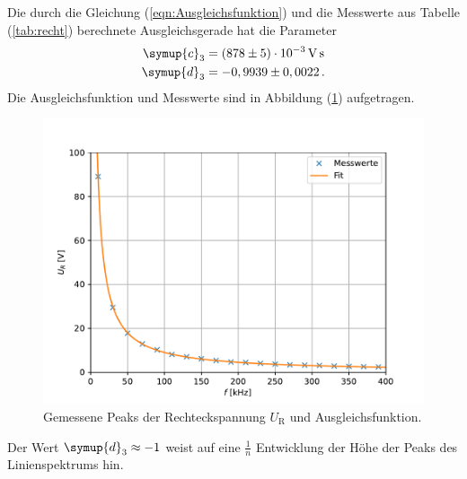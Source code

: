 Die durch die Gleichung (\ref{eqn:Ausgleichsfunktion}) und die Messwerte aus Tabelle (\ref{tab:recht}) berechnete Ausgleichsgerade hat die Parameter
\begin{align*}
  \symup{c}_3 &= (878 \pm 5) \cdot 10^{-3} \, \unit{\volt\second} \\
  \symup{d}_3 &= -0,9939 \pm 0,0022 \, .
\end{align*}
Die Ausgleichsfunktion und Messwerte sind in Abbildung (\ref{fig:recht}) aufgetragen. 
\begin{figure}[H]
  \centering
  \includegraphics[width = 0.7\linewidth]{plot2.pdf}
  \caption{Gemessene Peaks der Rechteckspannung $U_{\text{R}}$ und Ausgleichsfunktion.}
  \label{fig:recht}
\end{figure}
Der Wert $\symup{d}_3 \approx -1$ weist auf eine $\frac{1}{n}$ Entwicklung der Höhe der Peaks des Linienspektrums hin. 




